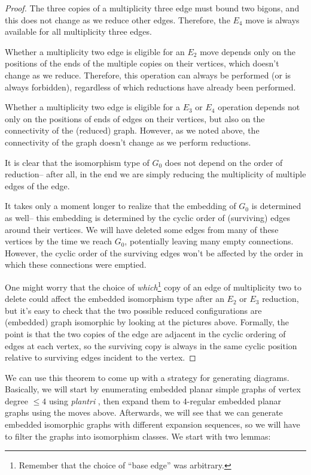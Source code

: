 \documentclass[amsmath,secnumarabic,floatfix,amssymb,nofootinbib,nobibnotes,letterpaper,11pt,tightenlines,showkeys]{revtex4}
\theoremstyle{definition}
\newcommand{\edgedouble}{E_2}
\newcommand{\cutedgedouble}{E_3}
\newcommand{\pairinsert}{E_4}
\newcommand{\plantri}{\textit{plantri} }
\begin{document}
\begin{proof}
The three copies of a multiplicity three edge must bound two bigons, and this does not change as we reduce other edges. Therefore, the $\pairinsert$ move is always available for all multiplicity three edges.

Whether a multiplicity two edge is eligible for an $\edgedouble$ move depends only on the positions of the ends of the multiple copies on their vertices, which doesn't change as we reduce. Therefore, this operation can always be performed (or is always forbidden), regardless of which reductions have already been performed.

Whether a multiplicity two edge is eligible for a $\cutedgedouble$ or $\pairinsert$ operation depends not only on the positions of ends of edges on their vertices, but also on the connectivity of the (reduced) graph. However, as we noted above, the connectivity of the graph doesn't change as we perform reductions.

It is clear that the isomorphism type of $G_0$ does not depend on the order of reduction-- after all, in the end we are simply reducing the multiplicity of multiple edges of the edge.

It takes only a moment longer to realize that the embedding of $G_0$ is determined as well-- this embedding is determined by the cyclic order of (surviving) edges around their vertices. We will have deleted some edges from many of these vertices by the time we reach $G_0$, potentially leaving many empty connections. However, the cyclic order of the surviving edges won't be affected by the order in which these connections were emptied.

One might worry that the choice of \emph{which}\footnote{Remember that the choice of ``base edge'' was arbitrary.} copy of an edge of multiplicity two to delete could affect the embedded isomorphism type after an $\edgedouble$ or $\cutedgedouble$ reduction, but it's easy to check that the two possible reduced configurations are (embedded) graph isomorphic by looking at the pictures above. Formally, the point is that the two copies of the edge are adjacent in the cyclic ordering of edges at each vertex, so the surviving copy is always in the same cyclic position relative to surviving edges incident to the vertex.
\end{proof}

We can use this theorem to come up with a strategy for generating diagrams. Basically, we will start by enumerating embedded planar simple graphs of vertex degree $\leq 4$ using \plantri, then expand them to $4$-regular embedded planar graphs using the moves above. Afterwards, we will see that we can generate embedded isomorphic graphs with different expansion sequences, so we will have to filter the graphs into isomorphism classes. We start with two lemmas:
\end{document}
